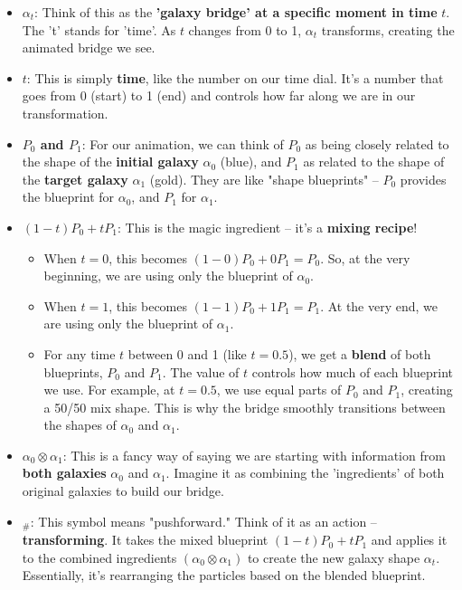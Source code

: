 \documentclass{article}
\begin{document}
\begin{itemize}
    \item \textbf{\( \alpha_t \)}:  Think of this as the \textbf{'galaxy bridge' at a specific moment in time} \( t \).  The 't' stands for 'time'.  As \( t \) changes from 0 to 1, \( \alpha_t \) transforms, creating the animated bridge we see.
    \item \textbf{\( t \)}:  This is simply \textbf{time}, like the number on our time dial. It's a number that goes from 0 (start) to 1 (end) and controls how far along we are in our transformation.
    \item \textbf{\( P_0 \) and \( P_1 \)}:  For our animation, we can think of \( P_0 \) as being closely related to the shape of the \textbf{initial galaxy} \( \alpha_0 \) (blue), and \( P_1 \) as related to the shape of the \textbf{target galaxy} \( \alpha_1 \) (gold).  They are like "shape blueprints" – \( P_0 \) provides the blueprint for \( \alpha_0 \), and \( P_1 \) for \( \alpha_1 \).
    \item \textbf{\( (1 - t)P_0 + tP_1 \)}: This is the magic ingredient – it's a \textbf{mixing recipe}!
        \begin{itemize}
            \item When \( t = 0 \), this becomes \( (1 - 0)P_0 + 0P_1 = P_0 \). So, at the very beginning, we are using only the blueprint of \( \alpha_0 \).
            \item When \( t = 1 \), this becomes \( (1 - 1)P_0 + 1P_1 = P_1 \). At the very end, we are using only the blueprint of \( \alpha_1 \).
            \item For any time \( t \) between 0 and 1 (like \( t = 0.5 \)), we get a \textbf{blend} of both blueprints, \( P_0 \) and \( P_1 \). The value of \( t \) controls how much of each blueprint we use. For example, at \( t = 0.5 \), we use equal parts of \( P_0 \) and \( P_1 \), creating a 50/50 mix shape.  This is why the bridge smoothly transitions between the shapes of \( \alpha_0 \) and \( \alpha_1 \).
        \end{itemize}
    \item \textbf{\( \alpha_0 \otimes \alpha_1 \)}:  This is a fancy way of saying we are starting with information from \textbf{both galaxies} \( \alpha_0 \) and \( \alpha_1 \).  Imagine it as combining the 'ingredients' of both original galaxies to build our bridge.
    \item \textbf{\( _{\#} \)}: This symbol means "pushforward."  Think of it as an action – \textbf{transforming}.  It takes the mixed blueprint \( (1 - t)P_0 + tP_1 \) and applies it to the combined ingredients \( (\alpha_0 \otimes \alpha_1) \) to create the new galaxy shape \( \alpha_t \).  Essentially, it's rearranging the particles based on the blended blueprint.
\end{itemize}
\end{document}

